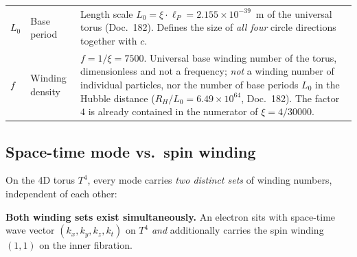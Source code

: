 \begin{center}
{{\begin{tabular}{>{\raggedright\arraybackslash}p{2.6cm}>{\raggedright\arraybackslash}p{2.8cm}>{\raggedright\arraybackslash}p{7.4cm}}
$L_0$ &
  Base period &
  Length scale $L_0 = \xi\cdot\ell_P = 2.155\times10^{-39}$~m of the universal torus (Doc.~182). Defines the size of \emph{all four} circle directions together with $c$. \\
$f$ &
  Winding density &
  $f = 1/\xi = 7500$. Universal base winding number of the torus, dimensionless and not a frequency; \emph{not} a winding number of individual particles, nor the number of base periods $L_0$ in the Hubble distance ($R_H/L_0 = 6.49\times10^{64}$, Doc.~182). The factor $4$ is already contained in the numerator of $\xi = 4/30000$. \\
\bottomrule
\end{tabular}%
}
}
\renewcommand{\arraystretch}{1.0}
\end{center}

\subsection*{Space-time mode vs.\ spin winding}

On the 4D torus $T^4$, every mode carries \emph{two distinct sets}
of winding numbers, independent of each other:

\begin{center}
\renewcommand{\arraystretch}{1.4}
\setlength{\tabcolsep}{8pt}
\setlength{\tabcolsep}{6pt}
\renewcommand{\arraystretch}{1.0}
\end{center}

\textbf{Both winding sets exist simultaneously.} An electron sits
with space-time wave vector $(k_x,k_y,k_z,k_t)$ on $T^4$ \emph{and}
additionally carries the spin winding $(1,1)$ on the inner fibration.

